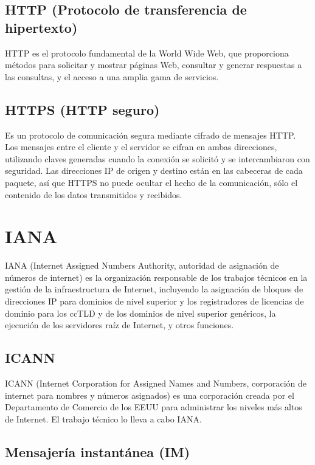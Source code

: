 \subsection{HTTP (Protocolo de transferencia de
hipertexto)}\label{http-protocolo-de-transferencia-de-hipertexto}

HTTP es el protocolo fundamental de la World Wide Web, que proporciona
métodos para solicitar y mostrar páginas Web, consultar y generar
respuestas a las consultas, y el acceso a una amplia gama de servicios.

\subsection{HTTPS (HTTP seguro)}\label{https-http-seguro}

Es un protocolo de comunicación segura mediante cifrado de mensajes
HTTP. Los mensajes entre el cliente y el servidor se cifran en ambas
direcciones, utilizando claves generadas cuando la conexión se solicitó
y se intercambiaron con seguridad. Las direcciones IP de origen y
destino están en las cabeceras de cada paquete, así que HTTPS no puede
ocultar el hecho de la comunicación, sólo el contenido de los datos
transmitidos y recibidos.

\section{IANA}\label{iana}

IANA (Internet Assigned Numbers Authority, autoridad de asignación de
números de internet) es la organización responsable de los trabajos
técnicos en la gestión de la infraestructura de Internet, incluyendo la
asignación de bloques de direcciones IP para dominios de nivel superior
y los registradores de licencias de dominio para los ccTLD y de los
dominios de nivel superior genéricos, la ejecución de los servidores
raíz de Internet, y otros funciones.

\subsection{ICANN}\label{icann}

ICANN (Internet Corporation for Assigned Names and Numbers, corporación
de internet para nombres y números asignados) es una corporación creada
por el Departamento de Comercio de los EEUU para administrar los niveles
más altos de Internet. El trabajo técnico lo lleva a cabo IANA.

\subsection{Mensajería instantánea
(IM)}\label{mensajeruxeda-instantuxe1nea-im}

